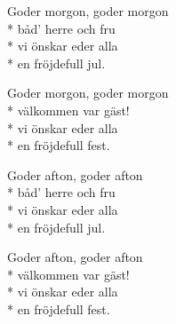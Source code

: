 \begin{SongText}
    \begin{SongVerse}
        Goder morgon, goder morgon\\*%
        båd’ herre och fru\\*%
        vi önskar eder alla\\*%
        en fröjdefull jul.
    \end{SongVerse}
    \begin{SongVerse}
        Goder morgon, goder morgon\\*%
        välkommen var gäst!\\*%
        vi önskar eder alla\\*%
        en fröjdefull fest.
    \end{SongVerse}
    \begin{SongVerse}
        Goder afton, goder afton\\*%
        båd’ herre och fru\\*%
        vi önskar eder alla\\*%
        en fröjdefull jul.
    \end{SongVerse}
    \begin{SongVerse}
        Goder afton, goder afton\\*%
        välkommen var gäst!\\*%
        vi önskar eder alla\\*%
        en fröjdefull fest.
    \end{SongVerse}
    \begin{SongVerse}
    \end{SongVerse}
\end{SongText}
